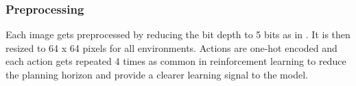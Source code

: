 \subsubsection{Preprocessing}

Each image gets preprocessed by reducing the bit depth to 5 bits as in \cite{Algo.Glow5bit}. It is then resized to 64 x 64 pixels for all environments.
Actions are one-hot encoded and each action gets repeated 4 times as common in reinforcement learning \cite{Algo.DQN} to reduce the planning horizon and provide a clearer learning signal to the model.
